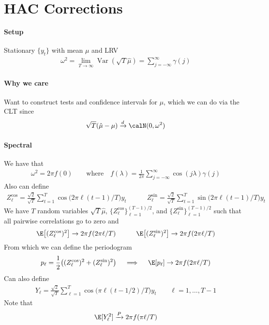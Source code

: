 \documentclass[12pt]{article}
\theoremstyle{plain}
\theoremstyle{definition}
\theoremstyle{remark}
\newcommand{\ra}{\rightarrow}
\newcommand{\Var}{\operatorname{Var}}
\newcommand{\pto}{\xrightarrow{P}}
\newcommand{\dto}{\xrightarrow{d}}
\newcommand{\sumtT}{\sum^T_{t=1}}
\newcommand{\limT}{\lim_{T\rightarrow\infty}}
\begin{document}
\clearpage
\section{HAC Corrections}

\paragraph{Setup}
Stationary $\{y_t\}$ with mean $\mu$ and LRV
\begin{align*}
  \omega^2
  =
  \limT \Var(\sqrt{T}\hat{\mu})
  =
  \sum_{j=-\infty}^\infty \gamma(j)
\end{align*}
\paragraph{Why we care}
Want to construct tests and confidence intervals for $\mu$, which we can
do via the CLT since
\begin{align*}
  \sqrt{T}(\hat{\mu}-\mu)
  \dto \calN(0,\omega^2)
\end{align*}
\paragraph{Spectral}
We have that
\begin{align*}
  \omega^2 = 2\pi f(0)
  \qquad\text{where}\quad
  f(\lambda)
  =
  \frac{1}{2\pi}
  \sum_{j=-\infty}^\infty
  \cos(j\lambda)\gamma(j)
\end{align*}
Also can define
\begin{align*}
  Z_\ell^{\cos}
  =
  \frac{\sqrt{2}}{\sqrt{T}}
  \sumtT
  \cos\big(2\pi\ell(t-1)/T\big)y_t
  \quad\qquad
  Z_\ell^{\sin}
  =
  \frac{\sqrt{2}}{\sqrt{T}}
  \sumtT
  \sin\big(2\pi\ell(t-1)/T\big)y_t
\end{align*}
We have $T$ random variables $\sqrt{T}\hat{\mu}$,
$\{Z_\ell^{\cos}\}_{\ell=1}^{(T-1)/2}$, and
$\{Z_\ell^{\sin}\}_{\ell=1}^{(T-1)/2}$
such that all pairwise correlations go to zero and
\begin{align*}
  \E\big[(Z_\ell^{\cos})^2\big]
  \ra
  2\pi f(2\pi\ell/T)
  \quad\qquad
  \E\big[(Z_\ell^{\sin})^2\big]
  \ra
  2\pi f(2\pi\ell/T)
\end{align*}
From which we can define the periodogram
\begin{align*}
  p_\ell
  =
  \frac{1}{2}
  \big(
  (Z_\ell^{\cos})^2
  +(Z_\ell^{\sin})^2
  \big)
  \quad\implies\quad
  \E[p_\ell]
  \ra
  2\pi f(2\pi\ell/T)
\end{align*}
Can also define
\begin{align*}
  Y_\ell
  =
  \frac{\sqrt{2}}{\sqrt{T}}
  \sum_{\ell=1}^T
  \cos\big(\pi\ell(t-1/2)/T\big)y_t
  \qquad
  \ell=1,\ldots,T-1
\end{align*}
Note that
\begin{align*}
  \E[Y_\ell^2]
  \pto 2\pi f(\pi\ell/T)
\end{align*}
\end{document}
